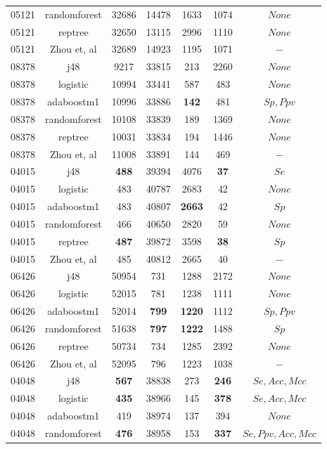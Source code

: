 \begin{table}[h]
\begin{center}
\begin{threeparttable}
\begin{tabular}{c c c c c c c}
    05121 & randomforest & 32686 & 14478 & 1633 & 1074 & $None$ \\
    05121 & reptree & 32650 & 13115 & 2996 & 1110 & $None$ \\
    05121 & Zhou et, al & 32689 & 14923 & 1195 & 1071 & $-$ \\
    \hline
    08378 & j48 & 9217 & 33815 & 213 & 2260 & $None$ \\
    08378 & logistic & 10994 & 33441 & 587 & 483 & $None$ \\
    08378 & adaboostm1 & 10996 & 33886 & \textbf{142} & 481 & $Sp, Ppv$ \\
    08378 & randomforest & 10108 & 33839 & 189 & 1369 & $None$ \\
    08378 & reptree & 10031 & 33834 & 194 & 1446 & $None$ \\
    08378 & Zhou et, al & 11008 & 33891 & 144 & 469 & $-$ \\
    \hline
    04015 & j48 & \textbf{488} & 39394 & 4076 & \textbf{37} & $Se$ \\
    04015 & logistic & 483 & 40787 & 2683 & 42 & $None$ \\
    04015 & adaboostm1 & 483 & 40807 & \textbf{2663} & 42 & $Sp$ \\
    04015 & randomforest & 466 & 40650 & 2820 & 59 & $None$ \\
    04015 & reptree & \textbf{487} & 39872 & 3598 & \textbf{38} & $Sp$ \\
    04015 & Zhou et, al & 485 & 40812 & 2665 & 40 & $-$ \\
    \hline
    06426 & j48 & 50954 & 731 & 1288 & 2172 & $None$ \\
    06426 & logistic & 52015 & 781 & 1238 & 1111 & $None$ \\
    06426 & adaboostm1 & 52014 & \textbf{799} & \textbf{1220} & 1112 & $Sp, Ppv$ \\
    06426 & randomforest & 51638 & \textbf{797} & \textbf{1222} & 1488 & $Sp$ \\
    06426 & reptree & 50734 & 734 & 1285 & 2392 & $None$ \\
    06426 & Zhou et, al & 52095 & 796 & 1223 & 1038 & $-$ \\
    \hline
    04048 & j48 & \textbf{567} & 38838 & 273 & \textbf{246} & $Se, Acc, Mcc$ \\
    04048 & logistic & \textbf{435} & 38966 & 145 & \textbf{378} & $Se, Acc, Mcc$ \\
    04048 & adaboostm1 & 419 & 38974 & 137 & 394 & $None$ \\
    04048 & randomforest & \textbf{476} & 38958 & 153 & \textbf{337} & $Se, Ppv, Acc, Mcc$ \\

\end{tabular}
\end{threeparttable}
\end{center}
\end{table}
